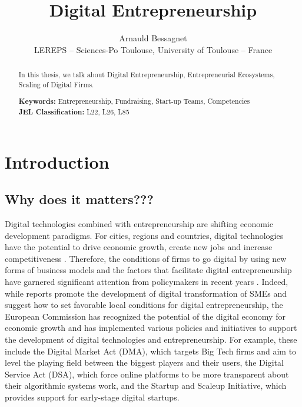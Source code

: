 \documentclass[12pt]{article}
\begin{document}
\title{Digital Entrepreneurship}
\date{\vspace{-3ex}}
\author{Arnauld Bessagnet \\ \footnotesize{LEREPS – Sciences-Po Toulouse, University of Toulouse – France} \\}

\maketitle \vspace{-1,5em}

\begin{abstract}
\noindent
In this thesis, we talk about Digital Entrepreneurship, Entrepreneurial Ecosystems, Scaling of Digital Firms.
\newline

\begin{obeylines}
\noindent \footnotesize{}{\textbf{Keywords:} Entrepreneurship, Fundraising, Start-up Teams, Competencies}
\noindent \footnotesize{\textbf{JEL Classification:} L22, L26, L85}
\end{obeylines}

\end{abstract}

\clearpage
\section{Introduction}

\subsection{Why does it matters???}
Digital technologies combined with entrepreneurship are shifting economic development paradigms. For cities, regions and countries, digital technologies have the potential to drive economic growth, create new jobs and increase competitiveness \citep{autio2016entrepreneurship}. Therefore, the conditions of firms to go digital by using new forms of business models and the factors that facilitate digital entrepreneurship have garnered significant attention from policymakers in recent years \citep{lisbon2016manifesto}. Indeed, while \citet{oecd2021digital, oecd2022scale} reports promote the development of digital transformation of SMEs and suggest how to set favorable local conditions for digital entrepreneurship, the European Commission has recognized the potential of the digital economy for economic growth and has implemented various policies and initiatives to support the development of digital technologies and entrepreneurship. For example, these include the Digital Market Act (DMA), which targets Big Tech firms and aim to level the playing field between the biggest players and their users, the Digital Service Act (DSA), which force online platforms to be more transparent about their algorithmic systems work, and the Startup and Scaleup Initiative, which provides support for early-stage digital startups.
\end{document}
